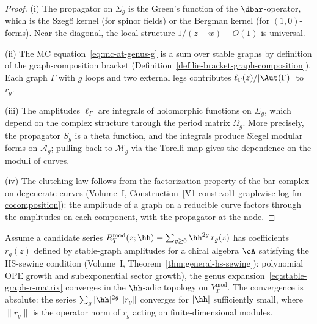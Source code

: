 \begin{proof}
(i) The propagator on $\Sigma_g$ is the Green's function of
the $\dbar$-operator, which is the Szeg\H{o} kernel (for spinor
fields) or the Bergman kernel (for $(1,0)$-forms). Near the
diagonal, the local structure $1/(z-w) + O(1)$ is universal.

(ii) The MC equation~\eqref{eq:mc-at-genus-g} is a sum over
stable graphs by definition of the graph-composition bracket
(Definition~\ref{def:lie-bracket-graph-composition}). Each graph
$\Gamma$ with $g$ loops and two external legs contributes
$\ell_\Gamma(z)/|\Aut(\Gamma)|$ to $r_g$.

(iii) The amplitudes $\ell_\Gamma$ are integrals of holomorphic
functions on $\Sigma_g$, which depend on the complex structure
through the period matrix $\Omega_g$. More precisely, the
propagator $S_g$ is a theta function, and the integrals produce
Siegel modular forms on $\mathcal{A}_g$; pulling back to
$\mathcal{M}_g$ via the Torelli map gives the dependence on the
moduli of curves.

(iv) The clutching law follows from the factorization property
of the bar complex on degenerate curves (Volume~I,
Construction~\ref*{V1-const:vol1-graphwise-log-fm-cocomposition}):
the amplitude of a graph on a reducible curve factors through the
amplitudes on each component, with the propagator at the node.
\end{proof}

\begin{proposition}
Assume a candidate series
$R_T^{\mathrm{mod}}(z; \hh) = \sum_{g \ge 0} \hh^{2g}\, r_g(z)$
has coefficients $r_g(z)$ defined by stable-graph amplitudes for a
chiral algebra $\cA$ satisfying the HS-sewing condition
\textup{(}Volume~I,
Theorem~\textup{\ref*{thm:general-hs-sewing}):} polynomial OPE
growth and subexponential sector growth\textup{)}, the genus
expansion~\eqref{eq:stable-graph-r-matrix}
converges in the $\hh$-adic topology on $Y_T^{\mathrm{mod}}$.
The convergence is absolute: the series
$\sum_g |\hh|^{2g}\, \|r_g\|$ converges for $|\hh|$
sufficiently small, where $\|r_g\|$ is the operator norm
of $r_g$ acting on finite-dimensional modules.
\end{proposition}

